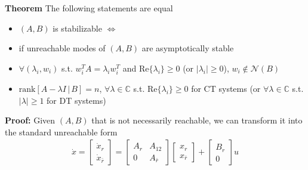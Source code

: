 \documentclass[twoside]{article}
\begin{document}
\textbf{Theorem} The following statements are equal 
\begin{itemize}
\item $(A,B)$ is stabilizable $\iff$
\item if unreachable modes of $(A,B)$ are asymptotically stable 
\item $\forall (\lambda_i , w_i)$ s.t. $w_i^T A = \lambda_i w_i^T$
and $\mathrm{Re}\lbrace \lambda_i \rbrace \geq 0$ (or $|\lambda_i|\geq0$),
$w_i \notin \mathcal{N}(B)$
\item $\mathrm{rank}\left[ A - \lambda I \, | \, B \right] = n$,
$\forall \lambda \in \mathbb{C}$ s.t. $\mathrm{Re}\lbrace \lambda_i \rbrace \geq 0$ for CT systems (or $\forall \lambda \in \mathbb{C}$ s.t. $|\lambda|  \geq 1$ for DT systems)
\end{itemize}

\textbf{Proof:} Given $(A,B)$ that is not necessarily reachable, we can transform it into the standard unreachable form
%
\begin{align*}
\dot{x} = \left[ \begin{array}{c} \dot{x}_r \\ \dot{x}_{\bar{r}} \end{array} \right]  = \left[ \begin{array}{c|c} A_{r} & A_{12} \\ \hline 0 & A_{\bar{r}} \end{array} \right] \left[ \begin{array}{c} x_r \\ x_{\bar{r}} \end{array} \right]  
+ \left[ \begin{array}{c} B_r \\ 0 \end{array} \right] u
\end{align*}


\end{document}
